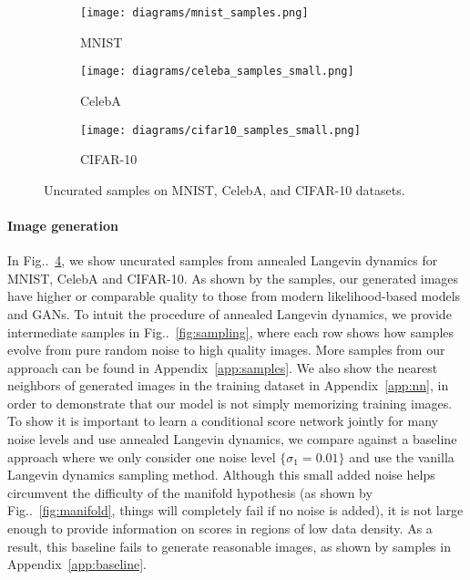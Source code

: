 \documentclass{article}
\makeatletter
\def\@onedot{\ifx\@let@token.\else.\null\fi\xspace}
\DeclareRobustCommand\onedot{\futurelet\@let@token\@onedot}
\newcommand{\figref}[1]{Fig\onedot~\ref{#1}}
\makeatother
\begin{document}
\begin{figure}\centering
    \begin{subfigure}[b]{0.3\textwidth}
        \texttt{[image: diagrams/mnist\_samples.png]}
        \caption{MNIST}
        \label{fig:mnist_samples}
    \end{subfigure}
    \begin{subfigure}[b]{0.3\textwidth}
        \texttt{[image: diagrams/celeba\_samples\_small.png]}
        \caption{CelebA}
        \label{fig:celeba_samples}
    \end{subfigure}
    \begin{subfigure}[b]{0.3\textwidth}
        \texttt{[image: diagrams/cifar10\_samples\_small.png]}
        \caption{CIFAR-10}
        \label{fig:cifar10_samples}
    \end{subfigure}
    \caption{Uncurated samples on MNIST, CelebA, and CIFAR-10 datasets.}
    \label{fig:samples}
\end{figure}

\paragraph{Image generation} In \figref{fig:samples}, we show uncurated samples from annealed Langevin dynamics for MNIST, CelebA and CIFAR-10. As shown by the samples, our generated images have higher or comparable quality to those from modern likelihood-based models and GANs. To intuit the procedure of annealed Langevin dynamics, we provide intermediate samples in \figref{fig:sampling}, where each row shows how samples evolve from pure random noise to high quality images. More samples from our approach can be found in Appendix~\ref{app:samples}. We also show the nearest neighbors of generated images in the training dataset in Appendix~\ref{app:nn}, in order to demonstrate that our model is not simply memorizing training images. To show it is important to learn a conditional score network jointly for many noise levels and use annealed Langevin dynamics, we compare against a baseline approach where we only consider one noise level $\{\sigma_1 = 0.01\}$ and use the vanilla Langevin dynamics sampling method. Although this small added noise helps circumvent the difficulty of the manifold hypothesis (as shown by \figref{fig:manifold}, things will completely fail if no noise is added), it is not large enough to provide information on scores in regions of low data density. As a result, this baseline fails to generate reasonable images, as shown by samples in Appendix~\ref{app:baseline}.
\end{document}
